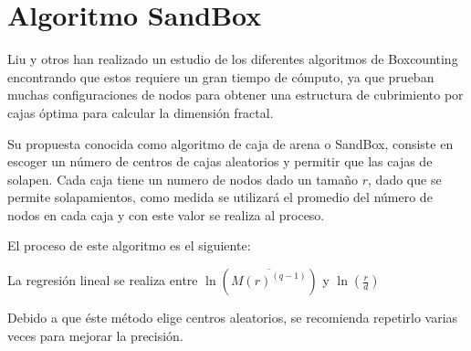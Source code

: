 \section{Algoritmo SandBox}
\label{cap4:seccionSB}

Liu y otros\cite{Liu2015} han realizado un estudio de los diferentes algoritmos de Boxcounting encontrando que estos requiere un gran tiempo de cómputo, ya que prueban muchas configuraciones de nodos para obtener una estructura de cubrimiento por cajas óptima para calcular la dimensión fractal.

Su propuesta conocida como algoritmo de caja de arena o SandBox, consiste en escoger un número de centros de cajas aleatorios y permitir que las cajas de solapen. Cada caja tiene un numero de nodos dado un tamaño $r$, dado que se permite solapamientos, como medida se utilizará el promedio del número de nodos en cada caja y con este valor se realiza al proceso.

El proceso de este algoritmo es el siguiente:


 La regresión lineal se realiza entre $\ln(\overline{M(r)^(q-1)})$ y $\ln(\frac{r}{d})$
 
Debido a que éste método elige centros aleatorios, se recomienda repetirlo varias veces para mejorar la precisión.
 

 